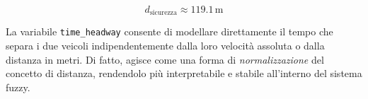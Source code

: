 \[
d_{\mathrm{sicurezza}} \approx 119.1\,\mathrm{m}
\]

\noindent La variabile \texttt{time\_headway} consente di modellare direttamente il tempo che separa i due veicoli 
indipendentemente dalla loro velocità assoluta o dalla distanza in metri. Di fatto, agisce come una forma di 
\emph{normalizzazione} del concetto di distanza, rendendolo più interpretabile e stabile all'interno del sistema fuzzy.
